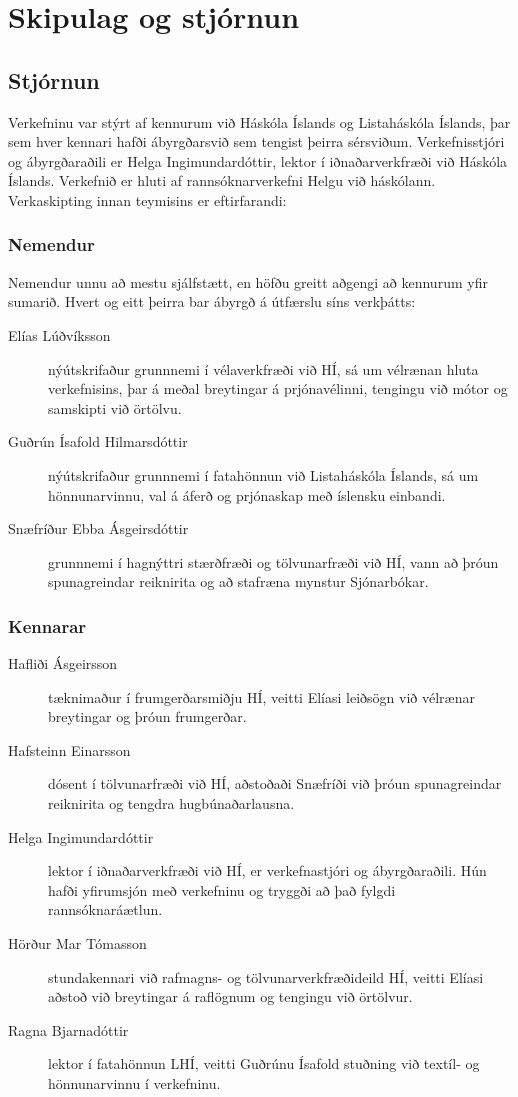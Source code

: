 \documentclass[a4paper,12pt,twoside]{article}
\begin{document}
\section{Skipulag og stjórnun}
\subsection{Stjórnun}
Verkefninu var stýrt af kennurum við Háskóla Íslands og Listaháskóla Íslands, þar sem hver kennari hafði ábyrgðarsvið sem tengist þeirra sérsviðum. Verkefnisstjóri og ábyrgðaraðili er Helga Ingimundardóttir, lektor í iðnaðarverkfræði við Háskóla Íslands. Verkefnið er hluti af rannsóknarverkefni Helgu við háskólann. Verkaskipting innan teymisins er eftirfarandi:

\subsubsection{Nemendur}
Nemendur unnu að mestu sjálfstætt, en höfðu greitt aðgengi að kennurum yfir sumarið. Hvert og eitt þeirra bar ábyrgð á útfærslu síns verkþátts:
\begin{description}
    \item[Elías Lúðvíksson] nýútskrifaður grunnnemi í vélaverkfræði við HÍ, sá um vélrænan hluta verkefnisins, þar á meðal breytingar á prjónavélinni, tengingu við mótor og samskipti við örtölvu.    
    \item[Guðrún Ísafold Hilmarsdóttir] nýútskrifaður grunnnemi í fatahönnun við Lista\-háskóla Íslands, sá um hönnunarvinnu, val á áferð og prjónaskap með íslensku einbandi.
    \item[Snæfríður Ebba Ásgeirsdóttir] grunnnemi í hagnýttri stærðfræði og tölvunarfræði við HÍ, vann að þróun spunagreindar reiknirita og að stafræna mynstur Sjónarbókar.
\end{description}

\subsubsection{Kennarar}
\begin{description}    
    \item[Hafliði Ásgeirsson] tæknimaður í frumgerðarsmiðju HÍ, veitti Elíasi leiðsögn við vélrænar breytingar og þróun frumgerðar.
    \item[Hafsteinn Einarsson] dósent í tölvunarfræði við HÍ, aðstoðaði Snæfríði við þróun spunagreindar reiknirita og tengdra hugbúnaðarlausna.    
    \item[Helga Ingimundardóttir] lektor í iðnaðarverkfræði við HÍ, er verkefnastjóri og ábyrgðar\-aðili. Hún hafði yfirumsjón með verkefninu og tryggði að það fylgdi rannsóknar\-áætlun.
    \item[Hörður Mar Tómasson] stundakennari við rafmagns- og tölvunarverkfræðideild HÍ, veitti Elíasi aðstoð við breytingar á raflögnum og tengingu við örtölvur.    
    \item[Ragna Bjarnadóttir] lektor í fatahönnun LHÍ, veitti Guðrúnu Ísafold stuðning við textíl- og hönnunarvinnu í verkefninu.
\end{description}
\end{document}
